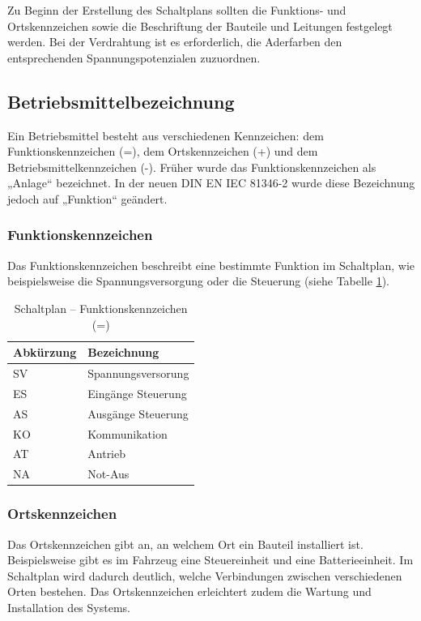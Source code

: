 Zu Beginn der Erstellung des Schaltplans sollten die Funktions- und Ortskennzeichen sowie die Beschriftung der Bauteile und Leitungen festgelegt werden. Bei der Verdrahtung ist es erforderlich, die Aderfarben den entsprechenden Spannungspotenzialen zuzuordnen.

\subsection{Betriebsmittelbezeichnung}
\label{Schaltplan:BMK}

Ein Betriebsmittel besteht aus verschiedenen Kennzeichen: dem Funktionskennzeichen (=), dem Ortskennzeichen (+) und dem Betriebsmittelkennzeichen (-). Früher wurde das Funktionskennzeichen als „Anlage“ bezeichnet. In der neuen DIN EN IEC 81346-2 \cite{DIN_EN_IEC_81346-2} wurde diese Bezeichnung jedoch auf „Funktion“ geändert.

\subsubsection{Funktionskennzeichen}
Das Funktionskennzeichen beschreibt eine bestimmte Funktion im Schaltplan, wie beispielsweise die Spannungsversorgung oder die Steuerung (siehe Tabelle \ref{BMK:tab:funktionskennzeichen}).

\pagebreak[1]
\begin{table}[!ht]
	\centering
	\caption{Schaltplan – Funktionskennzeichen (=)}
	\label{BMK:tab:funktionskennzeichen}
	\begin{tabular}{ll}
		\hline
		\textbf{Abkürzung}      & \textbf{Bezeichnung} \\ \hline
		\multicolumn{1}{l|}{SV} & Spannungsversorung   \\
		\multicolumn{1}{l|}{ES} & Eingänge Steuerung   \\
		\multicolumn{1}{l|}{AS} & Ausgänge Steuerung   \\
		\multicolumn{1}{l|}{KO} & Kommunikation        \\
		\multicolumn{1}{l|}{AT} & Antrieb              \\
		\multicolumn{1}{l|}{NA} & Not-Aus              \\ \hline
	\end{tabular}
\end{table}
\pagebreak[1]

\subsubsection{Ortskennzeichen}
Das Ortskennzeichen gibt an, an welchem Ort ein Bauteil installiert ist. Beispielsweise gibt es im Fahrzeug eine Steuereinheit und eine Batterieeinheit. Im Schaltplan wird dadurch deutlich, welche Verbindungen zwischen verschiedenen Orten bestehen. Das Ortskennzeichen erleichtert zudem die Wartung und Installation des Systems.


